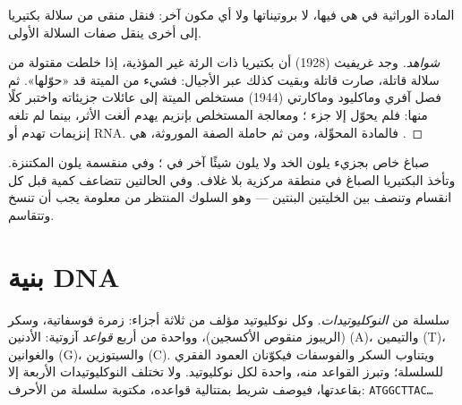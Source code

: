 \begin{proposition}\label{prop:g10:universal-dna:material}
المادة الوراثية في  هي  فيها، لا بروتيناتها ولا أي مكون آخر:
فنقل  منقى من سلالة بكتيريا إلى أخرى ينقل صفات السلالة الأولى.
\end{proposition}
\begin{proof}[شواهد]
وجد غريفيث (1928) أن بكتيريا ذات الرئة غير المؤذية، إذا خلطت 
مقتولة من سلالة قاتلة، صارت قاتلة وبقيت كذلك عبر الأجيال: فشيء من
 الميتة قد «حوّلها». ثم فصل آفري وماكليود وماكارتي (1944)
مستخلص  الميتة إلى عائلات جزيئاته واختبر كلًا منها: فلم يحوّل
إلا جزء ؛ ومعالجة المستخلص بإنزيم يهدم  ألغت الأثر، بينما لم
تلغه إنزيمات تهدم  أو RNA. فالمادة المحوِّلة، ومن ثم حاملة
الصفة الموروثة، هي .
\end{proof}

\begin{example}\label{ex:g10:universal-dna:where}
صباغ خاص بجزيء  يلون   الخد ولا يلون شيئًا آخر في ؛
وفي  منقسمة يلون  المكتنزة. وتأخذ البكتيريا الصباغ في
منطقة مركزية بلا غلاف. وفي الحالتين تتضاعف كمية  قبل كل انقسام
وتنصف بين الخليتين البنتين --- وهو السلوك المنتظر من معلومة يجب أن
تنسخ وتتقاسم.
\end{example}

\section{بنية DNA}

\begin{definition}[النوكليوتيد]\label{def:g10:universal-dna:nucleotide}
 سلسلة من \emph{النوكليوتيدات}. وكل نوكليوتيد
مؤلف من ثلاثة أجزاء: زمرة فوسفاتية، وسكر (الريبوز منقوص الأكسجين)،
وواحدة من أربع \emph{قواعد} آزوتية: الأدنين (A)،
والتيمين (T)، والغوانين (G)، والسيتوزين (C). ويتناوب السكر والفوسفات
فيكوّنان العمود الفقري للسلسلة؛ وتبرز القواعد منه، واحدة لكل
نوكليوتيد. ولا تختلف النوكليوتيدات الأربعة إلا بقاعدتها، فيوصف شريط
 بمتتالية قواعده، مكتوبة سلسلة من الأحرف:
\texttt{ATGGCTTAC\dots}
\end{definition}

